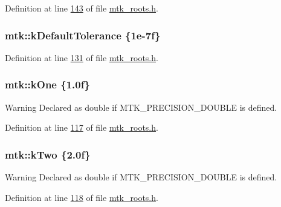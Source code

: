 Definition at line \hyperlink{mtk__roots_8h_source_l00143}{143} of file \hyperlink{mtk__roots_8h_source}{mtk\+\_\+roots.\+h}.

\hypertarget{group__c01-roots_gae914b125d81d1b97e0aee7bbc7739786}{
\subsubsection[{k\+Default\+Tolerance}]{\setlength{\rightskip}{0pt plus 5cm}mtk\+::k\+Default\+Tolerance \{1e-\/7f\}}}\label{group__c01-roots_gae914b125d81d1b97e0aee7bbc7739786}


Definition at line \hyperlink{mtk__roots_8h_source_l00131}{131} of file \hyperlink{mtk__roots_8h_source}{mtk\+\_\+roots.\+h}.

\hypertarget{group__c01-roots_ga26407c24d43b6b95480943340d285c71}{
\subsubsection[{k\+One}]{\setlength{\rightskip}{0pt plus 5cm}mtk\+::k\+One \{1.\+0f\}}}\label{group__c01-roots_ga26407c24d43b6b95480943340d285c71}
\begin{DoxyWarning}{Warning}
Declared as double if M\+T\+K\+\_\+\+P\+R\+E\+C\+I\+S\+I\+O\+N\+\_\+\+D\+O\+U\+B\+L\+E is defined. 
\end{DoxyWarning}


Definition at line \hyperlink{mtk__roots_8h_source_l00117}{117} of file \hyperlink{mtk__roots_8h_source}{mtk\+\_\+roots.\+h}.

\hypertarget{group__c01-roots_gaf39c2d851a2db744f4feb1c5ab3ec2cf}{
\subsubsection[{k\+Two}]{\setlength{\rightskip}{0pt plus 5cm}mtk\+::k\+Two \{2.\+0f\}}}\label{group__c01-roots_gaf39c2d851a2db744f4feb1c5ab3ec2cf}
\begin{DoxyWarning}{Warning}
Declared as double if M\+T\+K\+\_\+\+P\+R\+E\+C\+I\+S\+I\+O\+N\+\_\+\+D\+O\+U\+B\+L\+E is defined. 
\end{DoxyWarning}


Definition at line \hyperlink{mtk__roots_8h_source_l00118}{118} of file \hyperlink{mtk__roots_8h_source}{mtk\+\_\+roots.\+h}.

